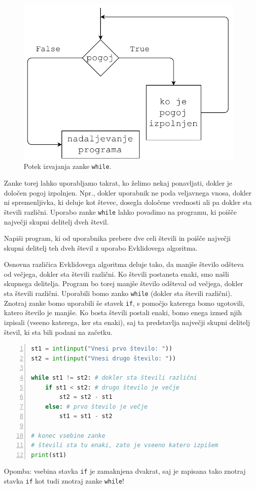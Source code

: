 \begin{figure}
    \centering
    \includegraphics[width=0.5\linewidth]{img/while1.pdf}
    \caption{Potek izvajanja zanke \texttt{while}.}
    \label{img:while1}
\end{figure}

Zanke torej lahko uporabljamo takrat, ko želimo nekaj ponavljati, dokler je določen pogoj izpolnjen. Npr., dokler uporabnik ne poda veljavnega vnosa, dokler ni spremenljivka, ki deluje kot števec, dosegla določene vrednosti ali pa dokler sta števili različni. Uporabo zanke \texttt{while} lahko povadimo na programu, ki poišče največji skupni delitelj dveh števil.
\begin{zgled}
Napiši program, ki od uporabnika prebere dve celi števili in poišče največji skupni delitelj teh dveh števil z uporabo Evklidovega algoritma.
\end{zgled}
\begin{resitev}
Osnovna različica Evklidovega algoritma deluje tako, da manjše število odšteva od večjega, dokler sta števili različni. Ko števili postaneta enaki, smo našli skupnega delitelja. Program bo torej manjše število odšteval od večjega, dokler sta števili različni. Uporabili bomo zanko \texttt{while} (dokler sta števili različni). Znotraj zanke bomo uporabili še stavek \texttt{if}, s pomočjo katerega bomo ugotovili, katero število je manjše. Ko bosta števili postali enaki, bomo enega izmed njih izpisali (vseeno katerega, ker sta enaki), saj ta predstavlja največji skupni delitelj števil, ki sta bili podani na začetku. 
\begin{lstlisting}[language=Python,numbers=left]
st1 = int(input("Vnesi prvo število: "))
st2 = int(input("Vnesi drugo število: "))

while st1 != st2: # dokler sta števili različni
    if st1 < st2: # drugo število je večje
        st2 = st2 - st1
    else: # prvo število je večje
        st1 = st1 - st2

# konec vsebine zanke 
# števili sta tu enaki, zato je vseeno katero izpišem
print(st1) 
\end{lstlisting}
Opomba: vsebina stavka \texttt{if} je zamaknjena dvakrat, saj je zapisana tako znotraj stavka \texttt{if} kot tudi znotraj zanke \texttt{while}!
\end{resitev}

